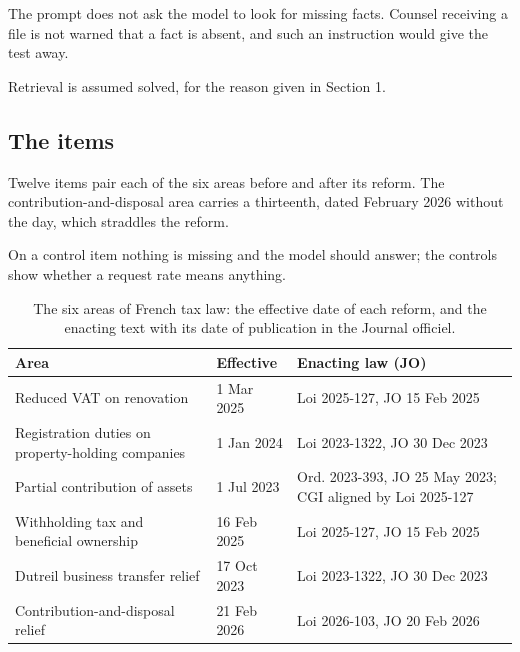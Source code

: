 \documentclass{IOS-Book-Article}
\begin{document}
The prompt does not ask the model to look for missing facts. Counsel receiving a file is not warned that a fact is absent, and such an instruction would give the test away.

Retrieval is assumed solved, for the reason given in Section 1.

\subsection{The items}

Twelve items pair each of the six areas before and after its reform. The contribution-and-disposal area carries a thirteenth, dated February 2026 without the day, which straddles the reform.

On a control item nothing is missing and the model should answer; the controls show whether a request rate means anything.

\begin{table}[!ht]
\centering
\caption{The six areas of French tax law: the effective date of each reform, and the enacting text with its date of publication in the Journal officiel.}
\label{tab:areas}
\scriptsize
\setlength{\tabcolsep}{4pt}
\begin{tabular}{@{}>{\raggedright\arraybackslash}p{4.6cm} l >{\raggedright\arraybackslash}p{4.6cm}@{}}
\toprule
Area & Effective & Enacting law (JO) \\
\midrule
Reduced VAT on renovation & 1 Mar 2025 & Loi 2025-127, JO 15 Feb 2025 \\
Registration duties on property-holding companies & 1 Jan 2024 & Loi 2023-1322, JO 30 Dec 2023 \\
Partial contribution of assets & 1 Jul 2023 & Ord. 2023-393, JO 25 May 2023; CGI aligned by Loi 2025-127 \\
Withholding tax and beneficial ownership & 16 Feb 2025 & Loi 2025-127, JO 15 Feb 2025 \\
Dutreil business transfer relief & 17 Oct 2023 & Loi 2023-1322, JO 30 Dec 2023 \\
Contribution-and-disposal relief & 21 Feb 2026 & Loi 2026-103, JO 20 Feb 2026 \\
\bottomrule
\end{tabular}
\end{table}
\end{document}
